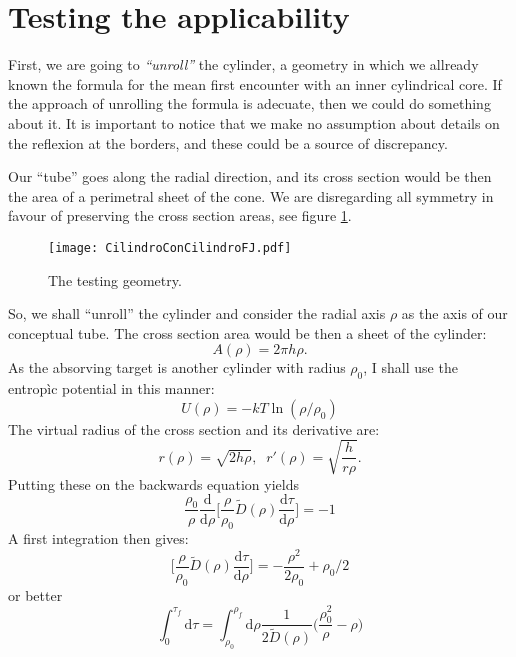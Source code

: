 \documentclass[letterpaperr,12pt]{article}
\newcommand{\rd}{\!\mathrm{d}}
\begin{document}
\section{Testing the applicability}

First, we are going to \emph{``unroll''} the cylinder, a geometry
in which we allready known the formula for the mean first encounter 
with an inner cylindrical core. If the approach of unrolling the formula
is adecuate, then we could do something about it. It is important
to notice that we make no assumption about details on
the reflexion at the borders, and these could be a source of discrepancy.

Our ``tube'' goes along the radial direction, and its cross section
would be then the area of a perimetral sheet of the cone. We are disregarding
all symmetry in favour of preserving the cross section areas, see
figure \ref{diagramacil01}.

\begin{figure}
\centering
\texttt{[image: CilindroConCilindroFJ.pdf]}
\caption{The testing geometry.}\label{diagramacil01}
\end{figure}
So, we shall ``unroll'' the cylinder and consider the radial axis $\rho$
as the axis of our conceptual tube. The cross section area would be then
a sheet of the cylinder:
\begin{equation}
A(\rho)=2 \pi h \rho.
\end{equation}
As the absorving target is another cylinder with radius $\rho_0$, I 
shall use the entropìc potential in this manner:
\begin{equation}
U(\rho)=-kT \ln(\rho/\rho_0)
\end{equation}
The virtual radius of the cross section and its derivative are:
\begin{equation}
r(\rho)=\sqrt{2h\rho}, \;\; r'(\rho)=\sqrt{\frac{h}{r\rho}}.
\end{equation}
Putting these on the backwards equation yields
\begin{equation}\label{backwardeval}
\frac{\rho_0}{\rho}
\frac{\rd}{\rd \rho}
\biggr[\frac{\rho}{\rho_0} \tilde{D}(\rho) \frac{\rd \tau}{\rd \rho} \biggr]=-1 
\end{equation}
A first integration then gives:
\begin{equation}
\biggr[\frac{\rho}{\rho_0} \tilde{D}(\rho) \frac{\rd \tau}{\rd \rho} \biggr]=
-\frac{\rho^2}{2\rho_0}+\rho_0/2 
\end{equation}
or better
\begin{equation}
\int_0^{\tau_f} \rd \tau= 
\int_{\rho_0}^{\rho_f} \rd \rho 
\frac{1}{2 \tilde{D}(\rho)} \biggr( \frac{\rho_0^2}{\rho}-\rho \biggl)
\end{equation}
\end{document}
